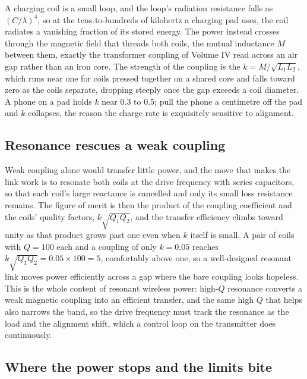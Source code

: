 A charging coil is a small loop, and the loop's radiation resistance falls
as $(C/\lambda)^4$, so at the tens-to-hundreds of kilohertz a charging pad
uses, the coil radiates a vanishing fraction of its stored energy. The
power instead crosses through the magnetic field that threads both coils,
the mutual inductance $M$ between them, exactly the transformer coupling of
Volume IV read across an air gap rather than an iron core. The strength of
the coupling is the  $k = M/\sqrt{L_1 L_2}$,
which runs near one for coils pressed together on a shared core and falls
toward zero as the coils separate, dropping steeply once the gap exceeds a
coil diameter. A phone on a pad holds $k$ near $0.3$ to $0.5$; pull the
phone a centimetre off the pad and $k$ collapses, the reason the charge
rate is exquisitely sensitive to alignment.

\subsection{Resonance rescues a weak coupling}

Weak coupling alone would transfer little power, and the move that makes
the link work is to resonate both coils at the drive frequency with series
capacitors, so that each coil's large reactance is cancelled and only its
small loss resistance remains. The figure of merit is then the product of
the coupling coefficient and the coils' quality factors, $k\sqrt{Q_1 Q_2}$,
and the transfer efficiency climbs toward unity as that product grows past
one even when $k$ itself is small. A pair of coils with $Q = 100$ each and
a coupling of only $k = 0.05$ reaches $k\sqrt{Q_1 Q_2} = 0.05\times 100 =
5$, comfortably above one, so a well-designed resonant link moves power
efficiently across a gap where the bare coupling looks hopeless. This is
the whole content of resonant wireless power: high-$Q$ resonance converts a
weak magnetic coupling into an efficient transfer, and the same high $Q$
that helps also narrows the band, so the drive frequency must track the
resonance as the load and the alignment shift, which a control loop on the
transmitter does continuously.

\subsection{Where the power stops and the limits bite}

